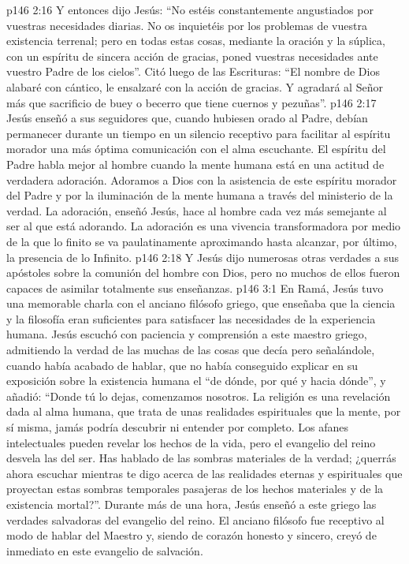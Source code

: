 \vs p146 2:16 Y entonces dijo Jesús: “No estéis constantemente angustiados por vuestras necesidades diarias. No os inquietéis por los problemas de vuestra existencia terrenal; pero en todas estas cosas, mediante la oración y la súplica, con un espíritu de sincera acción de gracias, poned vuestras necesidades ante vuestro Padre de los cielos”. Citó luego de las Escrituras: “El nombre de Dios alabaré con cántico, le ensalzaré con la acción de gracias. Y agradará al Señor más que sacrificio de buey o becerro que tiene cuernos y pezuñas”.
\vs p146 2:17 Jesús enseñó a sus seguidores que, cuando hubiesen orado al Padre, debían permanecer durante un tiempo en un silencio receptivo para facilitar al espíritu morador una más óptima comunicación con el alma escuchante. El espíritu del Padre habla mejor al hombre cuando la mente humana está en una actitud de verdadera adoración. Adoramos a Dios con la asistencia de este espíritu morador del Padre y por la iluminación de la mente humana a través del ministerio de la verdad. La adoración, enseñó Jesús, hace al hombre cada vez más semejante al ser al que está adorando. La adoración es una vivencia transformadora por medio de la que lo finito se va paulatinamente aproximando hasta alcanzar, por último, la presencia de lo Infinito.
\vs p146 2:18 \pc Y Jesús dijo numerosas otras verdades a sus apóstoles sobre la comunión del hombre con Dios, pero no muchos de ellos fueron capaces de asimilar totalmente sus enseñanzas.
\vs p146 3:1 En Ramá, Jesús tuvo una memorable charla con el anciano filósofo griego, que enseñaba que la ciencia y la filosofía eran suficientes para satisfacer las necesidades de la experiencia humana. Jesús escuchó con paciencia y comprensión a este maestro griego, admitiendo la verdad de las muchas de las cosas que decía pero señalándole, cuando había acabado de hablar, que no había conseguido explicar en su exposición sobre la existencia humana el “de dónde, por qué y hacia dónde”, y añadió: “Donde tú lo dejas, comenzamos nosotros. La religión es una revelación dada al alma humana, que trata de unas realidades espirituales que la mente, por sí misma, jamás podría descubrir ni entender por completo. Los afanes intelectuales pueden revelar los hechos de la vida, pero el evangelio del reino desvela las  del ser. Has hablado de las sombras materiales de la verdad; ¿querrás ahora escuchar mientras te digo acerca de las realidades eternas y espirituales que proyectan estas sombras temporales pasajeras de los hechos materiales y de la existencia mortal?”. Durante más de una hora, Jesús enseñó a este griego las verdades salvadoras del evangelio del reino. El anciano filósofo fue receptivo al modo de hablar del Maestro y, siendo de corazón honesto y sincero, creyó de inmediato en este evangelio de salvación.
